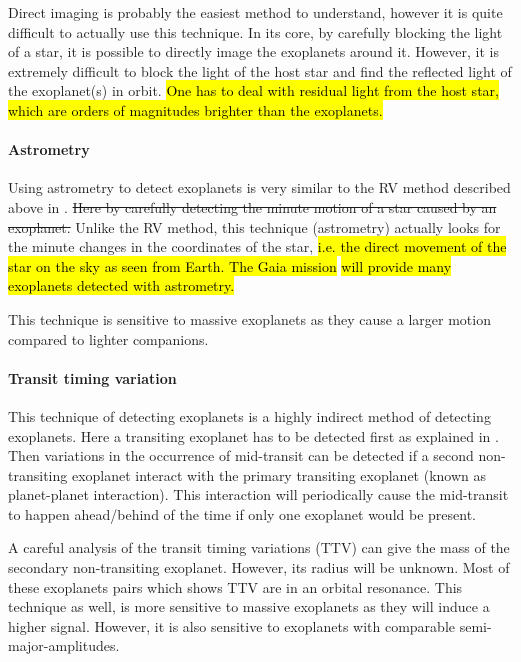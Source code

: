 Direct imaging is probably the easiest method to understand, however it is quite difficult to
actually use this technique. In its core, by carefully blocking the light of a star, it is possible
to directly image the exoplanets around it. However, it is extremely difficult to block the light
of the host star and find the reflected light of the exoplanet(s) in orbit. \hl{One has to deal with
residual light from the host star, which are orders of magnitudes brighter than the exoplanets.}


\paragraph{Astrometry}

Using astrometry to detect exoplanets is very similar to the RV method described above in
. \st{Here by carefully detecting the minute motion of a star caused by an
exoplanet.} Unlike the RV method, this technique (astrometry) actually looks for the minute changes
in the coordinates of the star, \hl{i.e. the direct movement of the star on the sky as seen from
Earth. The Gaia mission} \citep{GAIA} \hl{will provide many exoplanets detected with astrometry.}

This technique is sensitive to massive exoplanets as they cause a larger motion compared to lighter
companions.


\paragraph{Transit timing variation}

This technique of detecting exoplanets is a highly indirect method of detecting exoplanets. Here a
transiting exoplanet has to be detected first as explained in . Then
variations in the occurrence of mid-transit can be detected if a second non-transiting exoplanet
interact with the primary transiting exoplanet (known as planet-planet interaction). This
interaction will periodically cause the mid-transit to happen ahead/behind of the time if only one
exoplanet would be present.

A careful analysis of the transit timing variations (TTV) can give the mass of the secondary
non-transiting exoplanet. However, its radius will be unknown. Most of these exoplanets pairs which
shows TTV are in an orbital resonance. This technique as well, is more sensitive to massive
exoplanets as they will induce a higher signal. However, it is also sensitive to exoplanets with
comparable semi-major-amplitudes.


